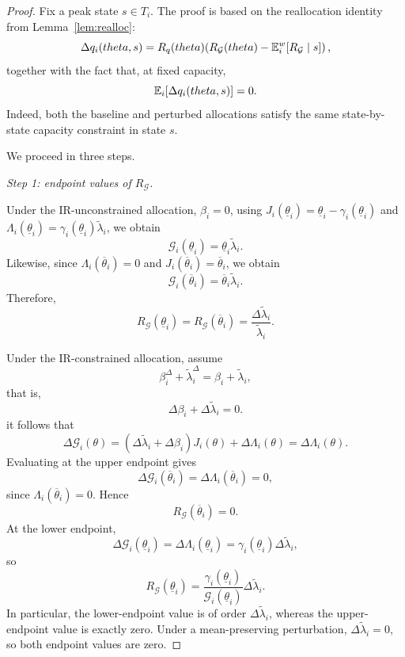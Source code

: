 \documentclass[master.tex]{subfiles}
\begin{document}
\begin{proof}
Fix a peak state $s\in T_i$. The proof is based on the reallocation identity from Lemma~\ref{lem:realloc}:
\begin{equation}\label{eq:realloc-proof}
\Delta q_i(theta,s)
=
R_q(theta)\!\left(
R_{\mathcal G}(theta)-\mathbb{E}_i^w\!\left[R_{\mathcal G}\mid s\right]
\right),
\end{equation}
together with the fact that, at fixed capacity,
\begin{equation}\label{eq:mean-zero-proof}
\mathbb{E}_i[\Delta q_i(theta,s)]=0.
\end{equation}
Indeed, both the baseline and perturbed allocations satisfy the same state-by-state capacity constraint in state $s$.

We proceed in three steps.

\noindent\textit{Step 1: endpoint values of $R_{\mathcal G}$.}

Under the IR-unconstrained allocation, $\beta_i=0$, using $J_i(\underline\theta_i)=\underline\theta_i-\gamma_i(\underline\theta_i)$ and
$\Lambda_i(\underline\theta_i)=\gamma_i(\underline\theta_i)\tilde\lambda_i$, we obtain
\[
\mathcal G_i(\underline\theta_i)=\underline\theta_i\tilde\lambda_i.
\]
Likewise, since $\Lambda_i(\overline\theta_i)=0$ and $J_i(\overline\theta_i)=\overline\theta_i$, we obtain
\[
\mathcal G_i(\overline\theta_i)=\overline\theta_i\tilde\lambda_i.
\]
Therefore,
\begin{equation}\label{eq:endpoint-unconstrained}
R_{\mathcal G}(\underline\theta_i)
=
R_{\mathcal G}(\overline\theta_i)
=
\frac{\Delta\tilde\lambda_i}{\tilde\lambda_i}.
\end{equation}

Under the IR-constrained allocation, assume
\[
\beta_i^\Delta+\tilde\lambda_i^\Delta=\beta_i+\tilde\lambda_i,
\]
that is,
\[
\Delta\beta_i+\Delta\tilde\lambda_i=0.
\]
it follows that
\[
\Delta\mathcal G_i(\theta)
=
(\Delta\tilde\lambda_i+\Delta\beta_i)J_i(\theta)+\Delta\Lambda_i(\theta)
=
\Delta\Lambda_i(\theta).
\]
Evaluating at the upper endpoint gives
\[
\Delta\mathcal G_i(\overline\theta_i)
=
\Delta\Lambda_i(\overline\theta_i)
=
0,
\]
since $\Lambda_i(\overline\theta_i)=0$. Hence
\begin{equation}\label{eq:upper-constrained}
R_{\mathcal G}(\overline\theta_i)=0.
\end{equation}
At the lower endpoint,
\[
\Delta\mathcal G_i(\underline\theta_i)
=
\Delta\Lambda_i(\underline\theta_i)
=
\gamma_i(\underline\theta_i)\Delta\tilde\lambda_i,
\]
so
\begin{equation}\label{eq:lower-constrained}
R_{\mathcal G}(\underline\theta_i)
=
\frac{\gamma_i(\underline\theta_i)}{\mathcal G_i(\underline\theta_i)}\Delta\tilde\lambda_i.
\end{equation}
In particular, the lower-endpoint value is of order $\Delta\tilde\lambda_i$, whereas the upper-endpoint value is exactly zero. Under a mean-preserving perturbation, $\Delta\tilde\lambda_i=0$, so both endpoint values are zero.



\end{proof}
\end{document}
